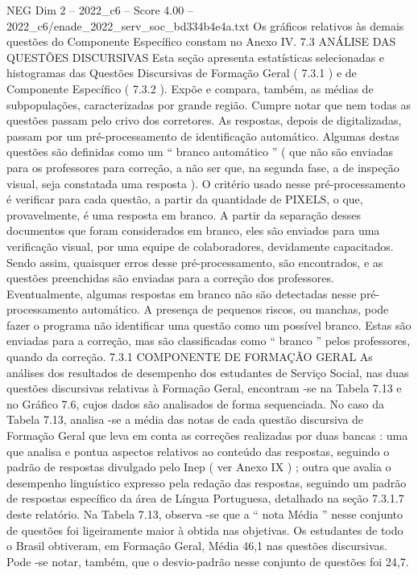 \begin{textsample}{NEG Dim 2 – 2022\_c6 – Score 4.00 – 2022\_c6/enade\_2022\_serv\_soc\_bd334b4e4a.txt}
Os gráficos relativos às demais questões do Componente Específico constam no Anexo IV. 7.3 ANÁLISE DAS QUESTÕES DISCURSIVAS Esta seção apresenta estatísticas selecionadas e histogramas das Questões Discursivas de Formação Geral ( 7.3.1 ) e de Componente Específico ( 7.3.2 ).
Expõe e compara, também, as médias de subpopulações, caracterizadas por grande região.
Cumpre notar que nem todas as questões passam pelo crivo dos corretores.
As respostas, depois de digitalizadas, passam por um pré-processamento de identificação automático.
Algumas destas questões são definidas como um “ branco automático ” ( que não são enviadas para os professores para correção, a não ser que, na segunda fase, a de inspeção visual, seja constatada uma resposta ).
O critério usado nesse pré-processamento é verificar para cada questão, a partir da quantidade de PIXELS, o que, provavelmente, é uma resposta em branco.
A partir da separação desses documentos que foram considerados em branco, eles são enviados para uma verificação visual, por uma equipe de colaboradores, devidamente capacitados.
Sendo assim, quaisquer erros desse pré-processamento, são encontrados, e as questões preenchidas são enviadas para a correção dos professores.
Eventualmente, algumas respostas em branco não são detectadas nesse pré-processamento automático.
A presença de pequenos riscos, ou manchas, pode fazer o programa não identificar uma questão como um possível branco.
Estas são enviadas para a correção, mas são classificadas como “ branco ” pelos professores, quando da correção. 7.3.1 COMPONENTE DE FORMAÇÃO GERAL As análises dos resultados de desempenho dos estudantes de Serviço Social, nas duas questões discursivas relativas à Formação Geral, encontram -se na Tabela 7.13 e no Gráfico 7.6, cujos dados são analisados de forma sequenciada.
No caso da Tabela 7.13, analisa -se a média das notas de cada questão discursiva de Formação Geral que leva em conta as correções realizadas por duas bancas : uma que analisa e pontua aspectos relativos ao conteúdo das respostas, seguindo o padrão de respostas divulgado pelo Inep ( ver Anexo IX ) ; outra que avalia o desempenho linguístico expresso pela redação das respostas, seguindo um padrão de respostas específico da área de Língua Portuguesa, detalhado na seção 7.3.1.7 deste relatório.
Na Tabela 7.13, observa -se que a “ nota Média ” nesse conjunto de questões foi ligeiramente maior à obtida nas objetivas.
Os estudantes de todo o Brasil obtiveram, em Formação Geral, Média 46,1 nas questões discursivas.
Pode -se notar, também, que o desvio-padrão nesse conjunto de questões foi 24,7.

\end{textsample}
